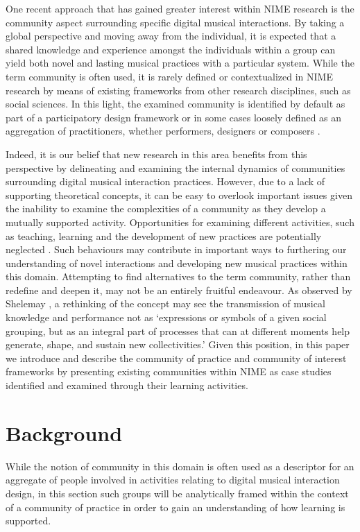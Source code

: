 One recent approach that has gained greater interest within NIME research is the community aspect surrounding specific digital musical interactions. By taking a global perspective and moving away from the individual, it is expected that a shared knowledge and experience amongst the individuals within a group can yield both novel and lasting musical practices with a particular system. While the term community is often used, it is rarely defined or contextualized in NIME research by means of existing frameworks from other research disciplines, such as social sciences. In this light, the examined community is identified by default as part of a participatory design framework or in some cases loosely defined as an aggregation of practitioners, whether performers, designers or composers \cite{Gaye:2006,McPherson:2012,Vallis:2011}.

Indeed, it is our belief that new research in this area benefits from this perspective by delineating and examining the internal dynamics of communities surrounding digital musical interaction practices. However, due to a lack of supporting theoretical concepts, it can be easy to overlook important issues given the inability to examine the complexities of a community as they develop a mutually supported activity. Opportunities for examining different activities, such as teaching, learning and the development of new practices are potentially neglected \cite{Bowman:2009}.  Such behaviours may contribute in important ways to furthering our understanding of novel interactions and developing new musical practices within this domain. Attempting to find alternatives to the term community, rather than redefine and deepen it, may not be an entirely fruitful endeavour. As observed by Shelemay \cite{Shelemay:2011}, a rethinking of the concept may see the transmission of musical knowledge and performance not as `expressions or symbols of a given social grouping, but as an integral part of processes that can at different moments help generate, shape, and sustain new collectivities.' Given this position, in this paper we introduce and describe the community of practice and community of interest frameworks by presenting existing communities within NIME as case studies identified and examined through their learning activities. 

\section{Background}
While the notion of community in this domain is often used as a descriptor for an aggregate of people involved in activities relating to digital musical interaction design, in this section such groups will be analytically framed within the context of a community of practice in order to gain an understanding of how learning is supported.

